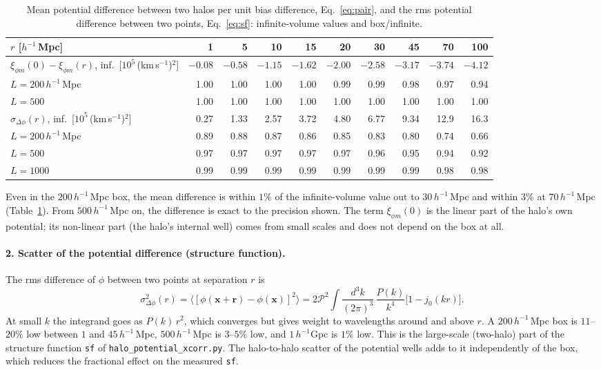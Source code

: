 \documentclass[11pt,a4paper]{article}
\newcommand{\fp}[1]{\nolinkurl{#1}}
\newcommand{\kms}{(km\,s$^{-1}$)$^2$}
\newcommand{\Mpch}{$h^{-1}$\,Mpc}
\begin{document}
\begin{table}[H]
\centering\small
\caption{Mean potential difference between two halos per unit bias difference, Eq.~\eqref{eq:pair}, and the rms
potential difference between two points, Eq.~\eqref{eq:sf}: infinite-volume values and box/infinite.}
\label{tab:diff}
\setlength{\tabcolsep}{4pt}
\begin{tabular}{@{}lrrrrrrrrr@{}}
\toprule
$r$ [\Mpch] & 1 & 5 & 10 & 15 & 20 & 30 & 45 & 70 & 100 \\
\midrule
$\xi_{\phi m}(0)-\xi_{\phi m}(r)$, inf.\ [$10^5$\,\kms] & $-0.08$ & $-0.58$ & $-1.15$ & $-1.62$ & $-2.00$ & $-2.58$ & $-3.17$ & $-3.74$ & $-4.12$\\
\quad $L=200$\,\Mpch & 1.00 & 1.00 & 1.00 & 1.00 & 0.99 & 0.99 & 0.98 & 0.97 & 0.94 \\
\quad $L=500$        & 1.00 & 1.00 & 1.00 & 1.00 & 1.00 & 1.00 & 1.00 & 1.00 & 1.00 \\
\midrule
$\sigma_{\Delta\phi}(r)$, inf.\ [$10^5$\,\kms] & 0.27 & 1.33 & 2.57 & 3.72 & 4.80 & 6.77 & 9.34 & 12.9 & 16.3 \\
\quad $L=200$\,\Mpch & 0.89 & 0.88 & 0.87 & 0.86 & 0.85 & 0.83 & 0.80 & 0.74 & 0.66 \\
\quad $L=500$        & 0.97 & 0.97 & 0.97 & 0.97 & 0.97 & 0.96 & 0.95 & 0.94 & 0.92 \\
\quad $L=1000$       & 0.99 & 0.99 & 0.99 & 0.99 & 0.99 & 0.99 & 0.99 & 0.98 & 0.98 \\
\bottomrule
\end{tabular}
\end{table}

Even in the $200$\,\Mpch{} box, the mean difference is within $1\%$ of the infinite-volume value out to $30$\,\Mpch{}
and within $3\%$ at $70$\,\Mpch{} (Table~\ref{tab:diff}). From $500$\,\Mpch{} on, the difference is exact to the
precision shown. The term $\xi_{\phi m}(0)$ is the linear part of the halo's own potential; its non-linear part
(the halo's internal well) comes from small scales and does not depend on the box at all.

\paragraph{2. Scatter of the potential difference (structure function).}
The rms difference of $\phi$ between two points at separation $r$ is
\begin{equation}
  \sigma^2_{\Delta\phi}(r) = \big\langle[\phi(\boldsymbol x+\boldsymbol r)-\phi(\boldsymbol x)]^2\big\rangle
  = 2\mathcal{P}^2\!\int\!\frac{d^3k}{(2\pi)^3}\,\frac{P(k)}{k^4}\big[1-j_0(kr)\big].
  \label{eq:sf}
\end{equation}
At small $k$ the integrand goes as $P(k)\,r^2$, which converges but gives weight to wavelengths around and above
$r$. A $200$\,\Mpch{} box is $11$--$20\%$ low between $1$ and $45$\,\Mpch, $500$\,\Mpch{} is $3$--$5\%$ low, and
$1\,h^{-1}$Gpc is $1\%$ low. This is the large-scale (two-halo) part of the structure function \fp{sf} of
\fp{halo_potential_xcorr.py}. The halo-to-halo scatter of the potential wells adds to it independently of the box,
which reduces the fractional effect on the measured \fp{sf}.
\end{document}
